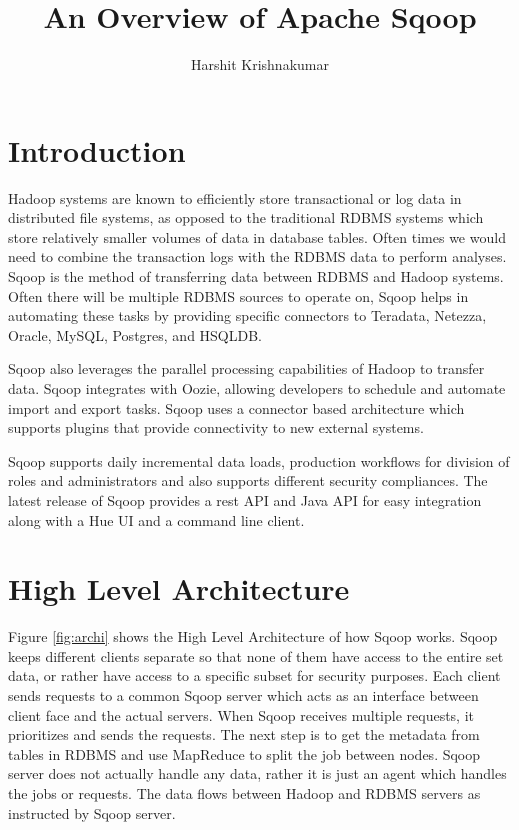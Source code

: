 \documentclass[9pt,twocolumn,twoside]{../../styles/osajnl}
\title{An Overview of Apache Sqoop}
\author[1,*]{Harshit Krishnakumar}
\affil[1]{School of Informatics and Computing, Bloomington, IN 47408, U.S.A.}
\affil[*]{Corresponding authors: harkrish@iu.edu, S17-IR-2014}
\begin{document}
\maketitle

\section{Introduction}

Hadoop systems are known to efficiently store transactional or log data in distributed file systems, as opposed to the traditional RDBMS systems which store relatively smaller volumes of data in database tables. Often times we would need to combine the transaction logs with the RDBMS data to perform analyses. Sqoop is the method of transferring data between RDBMS and Hadoop systems. Often there will be multiple RDBMS sources to operate on, Sqoop helps in automating these tasks by providing specific connectors to Teradata, Netezza, Oracle, MySQL, Postgres, and HSQLDB. 

Sqoop also leverages the parallel processing capabilities of Hadoop to transfer data. Sqoop integrates with Oozie, allowing developers to schedule and automate import and export tasks. Sqoop uses a connector based architecture which supports plugins that provide connectivity to new external systems.

Sqoop supports daily incremental data loads, production workflows for division of roles and administrators and also supports different security compliances. The latest release of Sqoop provides a rest API and Java API for easy integration along with a Hue UI and a command line client.\cite{cloudera}

\section{High Level Architecture}

Figure \ref{fig:archi} shows the High Level Architecture of how Sqoop works. Sqoop keeps different clients separate so that none of them have access to the entire set data, or rather have access to a specific subset for security purposes. Each client sends requests to a common Sqoop server which acts as an interface between client face and the actual servers. When Sqoop receives multiple requests, it prioritizes and sends the requests. The next step is to get the metadata from tables in RDBMS and use MapReduce to split the job between nodes. Sqoop server does not actually handle any data, rather it is just an agent which handles the jobs or requests. The data flows between Hadoop and RDBMS servers as instructed by Sqoop server\cite{sqoop-blog}.
\end{document}

